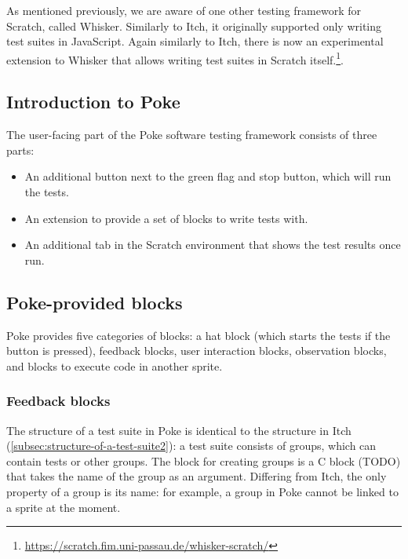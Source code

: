 \documentclass[../main]{subfiles}
\begin{document}
As mentioned previously, we are aware of one other testing framework for Scratch, called Whisker.
Similarly to Itch, it originally supported only writing test suites in JavaScript.
Again similarly to Itch, there is now an experimental extension to Whisker that allows writing test suites in Scratch itself.\footnote{\url{https://scratch.fim.uni-passau.de/whisker-scratch/}}.

\subsection{Introduction to Poke}\label{subsec:introduction-to-poke}

The user-facing part of the Poke software testing framework consists of three parts:

\begin{itemize}
    \item An additional button next to the green flag and stop button, which will run the tests.
    \item An extension to provide a set of blocks to write tests with.
    \item An additional tab in the Scratch environment that shows the test results once run.
\end{itemize}


\subsection{Poke-provided blocks}\label{subsec:poke-provided-blocks}

Poke provides five categories of blocks: a hat block (which starts the tests if the button is pressed), feedback blocks, user interaction blocks, observation blocks, and blocks to execute code in another sprite.

\subsubsection{Feedback blocks}

The structure of a test suite in Poke is identical to the structure in Itch (\cref{subsec:structure-of-a-test-suite2}): a test suite consists of groups, which can contain tests or other groups.
The block for creating groups is a C block (TODO) that takes the name of the group as an argument.
Differing from Itch, the only property of a group is its name: for example, a group in Poke cannot be linked to a sprite at the moment.
\end{document}
